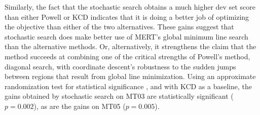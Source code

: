 \documentclass[11pt]{article}
\begin{document}
Similarly, the fact that the stochastic search obtains a much higher dev set score than either Powell or KCD indicates that it is doing a better job of optimizing the objective than either of the two alternatives. These gains suggest that stochastic search does make better use of MERT's global minimum line search than the alternative methods. Or, alternatively, it strengthens the claim that the method succeeds at combining one of the critical strengths of Powell's method, diagonal search, with coordinate descent's robustness to the sudden jumps between regions that result from global line minimization. Using an approximate randomization test for statistical significance \cite{fk2005}, and with KCD as a baseline, the gains obtained by stochastic search on MT03 are statistically significant ($p = 0.002$), as are the gains on MT05 ($p=0.005$). 

 
\end{document}
